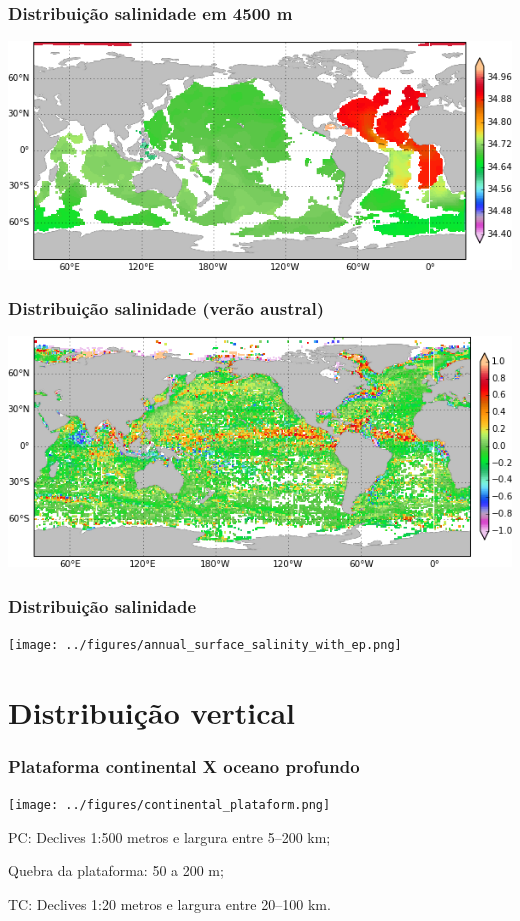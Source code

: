 \begin{frame}
\frametitle{Distribuição salinidade em 4500 m}
  \begin{center}
    \includegraphics[scale=0.6]{./figures/woa09_salinity_4500_annual.png}
  \end{center}
\end{frame}


\begin{frame}
\frametitle{Distribuição salinidade (verão austral)}
  \begin{center}
    \includegraphics[scale=0.6]{./figures/woa09_salinity_summer_anomaly.png}
  \end{center}
\end{frame}


\begin{frame}
\frametitle{Distribuição salinidade}
  \begin{center}
    \texttt{[image: ../figures/annual\_surface\_salinity\_with\_ep.png]}
  \end{center}
\end{frame}


\section{Distribuição vertical}
\begin{frame}
\frametitle{Plataforma continental X oceano profundo}

  \begin{center}
    \texttt{[image: ../figures/continental\_plataform.png]}
  \end{center}

  \begin{block}{}
  \scriptsize{
    PC: Declives 1:500 metros e largura entre 5--200 km;

    Quebra da plataforma: 50 a 200 m;

    TC: Declives 1:20 metros e largura entre 20--100 km.
    }
  \end{block}
\end{frame}


